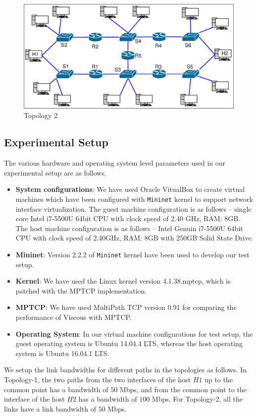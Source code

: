 \begin{figure}[!ht]
	\centering
	\includegraphics[width=\linewidth]{img/experimentalTopology2}
	\caption{Topology 2}
	\label{fig:experimentalTopology2}
\end{figure}



\subsection{Experimental Setup}
The various hardware and operating system level parameters used in our experimental setup are as follows. 
\begin{itemize}
    \item \textbf{System configurations}: We have used Oracle VitualBox to create virtual machines which have been configured with \texttt{Mininet} kernel to support network interface virtualization. The guest machine configuration is as follows -- single core Intel i7-5500U 64bit CPU with clock speed of 2.40 GHz, RAM: 8GB. The host machine configuration is as follows -- Intel Genuin i7-5500U 64bit CPU with clock speed of 2.40GHz, RAM: 8GB with 250GB Solid State Drive.
    \item \textbf{Mininet}: Version 2.2.2 of \texttt{Mininet} kernel have been used to develop our test setup.
    \item \textbf{Kernel}: We have used the Linux kernel version 4.1.38.mptcp, which is patched with the MPTCP implementation.
    \item \textbf{MPTCP}: We have used MultiPath TCP version 0.91 for comparing the performance of Viscous with MPTCP.
    \item \textbf{Operating System}: In our virtual machine configurations for test setup, the guest operating system is Ubuntu 14.04.4 LTS, whereas the host operating system is Ubuntu 16.04.1 LTS. 
\end{itemize}
We setup the link bandwidths for different paths in the topologies as follows. In Topology-1, the two paths from the two interfaces of the host $H1$ up to the common point has a bandwidth of $50$ Mbps, and from the common point to the interface of the host $H2$ has a bandwidth of $100$ Mbps. For Topology-2, all the links have a link bandwidth of $50$ Mbps. 
 
